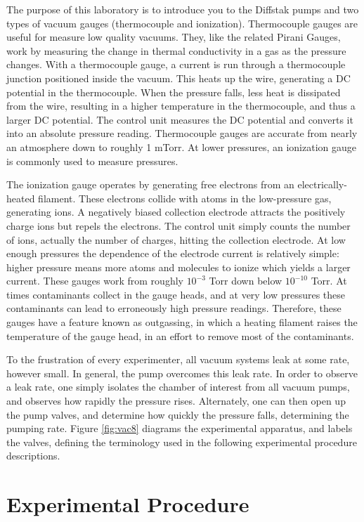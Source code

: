 The purpose of this laboratory is to introduce you to the Diffstak pumps and two types of vacuum gauges (thermocouple and ionization). Thermocouple gauges are useful for measure low quality vacuums. They, like the related Pirani Gauges, work by measuring the change in thermal conductivity in a gas as the pressure changes. With a thermocouple gauge, a current is run through a thermocouple junction positioned inside the vacuum. This heats up the wire, generating a DC potential in the thermocouple. When the pressure falls, less heat is dissipated from the wire, resulting in a higher temperature in the thermocouple, and thus a larger DC potential. The control unit measures the DC potential and converts it into an absolute pressure reading. Thermocouple gauges are accurate from nearly an atmosphere down to roughly 1 mTorr. At lower pressures, an ionization gauge is commonly used to measure pressures.

The ionization gauge operates by generating free electrons from an electrically-heated filament. These electrons collide with atoms in the low-pressure gas, generating ions. A negatively biased collection electrode attracts the positively charge ions but repels the electrons.  The control unit simply counts the number of ions, actually the number of charges, hitting the collection electrode. At low enough pressures the dependence of the electrode current is relatively simple: higher pressure means more atoms and molecules to ionize which yields a larger current. These gauges work from roughly $10^{-3}$ Torr down below $10^{-10}$ Torr. At times contaminants collect in the gauge heads, and at very low pressures these contaminants can lead to erroneously high pressure readings. Therefore, these gauges have a feature known as outgassing, in which a heating filament raises the temperature of the gauge head, in an effort to remove most of the contaminants.

To the frustration of every experimenter, all vacuum systems leak at some rate, however small. In general, the pump overcomes this leak rate. In order to observe a leak rate, one simply isolates the chamber of interest from all vacuum pumps, and observes how rapidly the pressure rises. Alternately, one can then open up the pump valves, and determine how quickly the pressure falls, determining the pumping rate. Figure \ref{fig:vac8} diagrams the experimental apparatus, and labels the valves, defining the terminology used in the following experimental procedure descriptions.

\section{Experimental Procedure}

